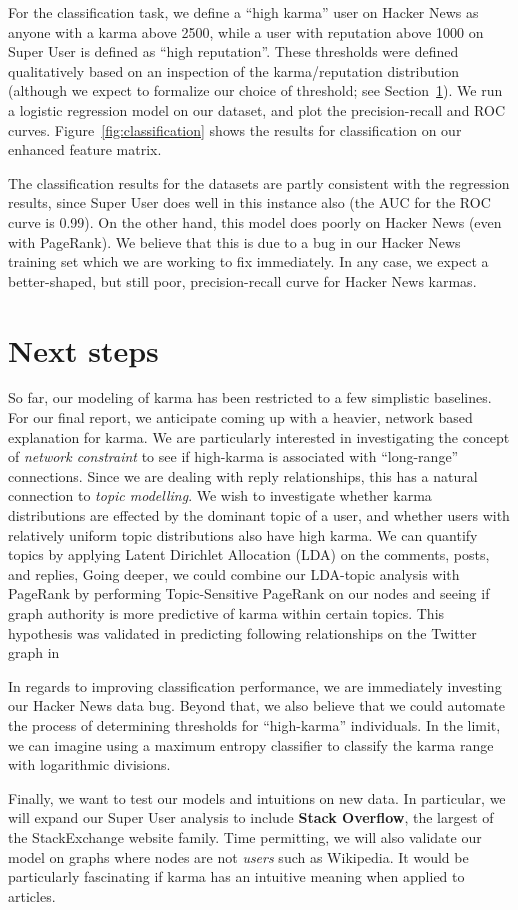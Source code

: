 \documentclass[10pt]{article}
\begin{document}
For the classification task, we define a ``high karma'' user on Hacker News as
anyone with a karma above 2500, while a user with reputation above 1000 on Super
User is defined as ``high reputation''. These thresholds were defined
qualitatively based on an inspection of the karma/reputation distribution
(although we expect to formalize our choice of threshold; see
Section~\ref{sec:next-steps}). We run a logistic regression model on our dataset,
and plot the precision-recall and ROC curves. Figure~\ref{fig:classification}
shows the results for classification on our enhanced feature matrix.

The classification results for the datasets are partly consistent with the
regression results, since Super User does well in this instance also (the AUC
for the ROC curve is 0.99). On the other hand, this model does poorly on Hacker
News (even with PageRank). We believe that this is due to a bug in our Hacker News
training set which we are working to fix immediately. In any case, we
expect a better-shaped, but still poor, precision-recall curve for Hacker News
karmas.

\section{Next steps}
\label{sec:next-steps}
So far, our modeling of karma has been restricted to a few simplistic baselines.
For our final report, we anticipate coming up with a heavier, network based
explanation for karma. We are particularly interested in investigating the concept of
\emph{network constraint} to see if high-karma is associated with ``long-range''
connections. Since we are dealing with reply relationships, this has a natural
connection to \textit{topic modelling}. We wish to investigate whether karma
distributions are effected by the dominant topic of a user, and whether users with
relatively uniform topic distributions also have high karma. We can quantify
topics by applying Latent Dirichlet Allocation (LDA) \citep{blei2003latent}
on the comments, posts, and replies, Going deeper, we could combine our LDA-topic analysis with PageRank by
performing Topic-Sensitive PageRank \citep{haveliwala2002topic} on our nodes
and seeing if graph authority is more predictive of karma within certain
topics. This hypothesis was validated in predicting following relationships
on the Twitter graph in \citet{weng2010twitterrank}

In regards to improving classification performance, we are immediately
investing our Hacker News data bug. Beyond that, we also believe that
we could automate the process of determining thresholds for ``high-karma''
individuals. In the limit, we can imagine using a maximum entropy classifier
to classify the karma range with logarithmic divisions.

Finally, we want to test our models and intuitions on new data. In particular, we 
will expand our Super User analysis to include \textbf{Stack Overflow}, the largest
of the StackExchange website family. Time permitting, we will also validate our
model on graphs where nodes are not \textit{users} such as Wikipedia. It would
be particularly fascinating if karma has an intuitive meaning when applied to 
articles. 



\end{document}
